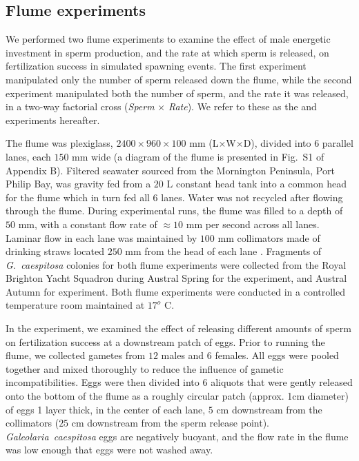 \documentclass{article}
\begin{document}
	\subsection*{Flume experiments}
	We performed two flume experiments to examine the effect of male energetic investment in sperm production, and the rate at which sperm is released, on fertilization success in simulated spawning events. The first experiment manipulated only the number of sperm released down the flume, while the second experiment manipulated both the number of sperm, and the rate it was released, in a two-way factorial cross (\textit{Sperm} $\times$ \textit{Rate}). We refer to these as the  and  experiments hereafter. 

	The flume was plexiglass, $2400 \times 960 \times 100$ mm (L$\times$W$\times$D), divided into $6$ parallel lanes, each $150$ mm wide (a diagram of the flume is presented in Fig.~S1 of Appendix B). Filtered seawater sourced from the Mornington Peninsula, Port Philip Bay, was gravity fed from a $20$ L constant head tank into a common head for the flume which in turn fed all $6$ lanes. Water was not recycled after flowing through the flume. During experimental runs, the flume was filled to a depth of $50$ mm, with a constant flow rate of $\approx 10$ mm per second across all lanes. Laminar flow in each lane was maintained by $100$ mm collimators made of drinking straws located $250$ mm from the head of each lane \citep{YundMeidel2003}. Fragments of \textit{G.~caespitosa} colonies for both flume experiments were collected from the Royal Brighton Yacht Squadron during Austral Spring for the  experiment, and Austral Autumn for  experiment. Both flume experiments were conducted in a controlled temperature room maintained at $17^o$ C.

	In the  experiment, we examined the effect of releasing different amounts of sperm on fertilization success at a downstream patch of eggs. Prior to running the flume, we collected gametes from $12$ males and $6$ females. All eggs were pooled together and mixed thoroughly to reduce the influence of gametic incompatibilities. Eggs were then divided into $6$ aliquots that were gently released onto the bottom of the flume as a roughly circular patch (approx. 1cm diameter) of eggs 1 layer thick, in the center of each lane, $5$ cm downstream from the collimators ($25$ cm downstream from the sperm release point). \textit{Galeolaria~caespitosa} eggs are negatively buoyant, and the flow rate in the flume was low enough that eggs were not washed away. 
\end{document}
